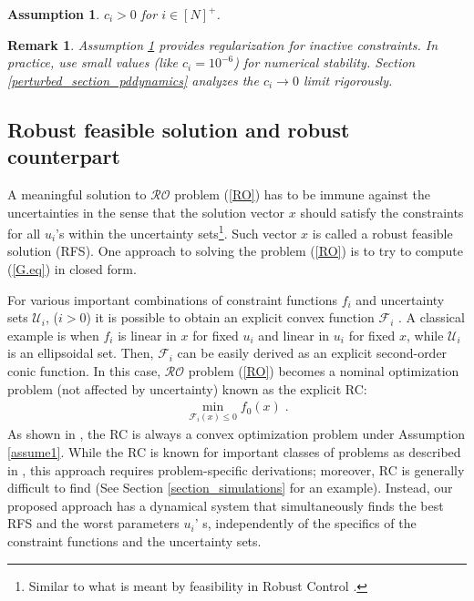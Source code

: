 \documentclass[journal,twoside,web]{ieeecolor}
\newcommand{\rev}[1]{#1}
\newtheorem{assumption}[theorem]{Assumption}
\newtheorem{remark}{Remark}
\begin{document}
\begin{assumption} \label{assume_c>0}
$c_i > 0$ for $i\in[N]^+$.
\end{assumption}

\begin{remark}\label{active_inactive_constraint_rem} 
\rev{Assumption \ref{assume_c>0} provides regularization for inactive constraints. In practice, use small values (like $c_i = 10^{-6}$) for numerical stability. Section \ref{perturbed_section_pddynamics} analyzes the $c_i \to 0$ limit rigorously.}
\end{remark}

\subsection{Robust feasible solution and robust counterpart}
A meaningful solution to $\mathcal{RO}$ problem (\ref{RO}) has to be immune against the uncertainties in the sense that the solution vector $x$ should satisfy the constraints for all $u_i$'s within the uncertainty sets\footnote{Similar to what is meant by feasibility in Robust Control \cite{zhou1995}.}. Such vector $x$ is called a robust feasible solution (RFS). One approach to solving the problem (\ref{RO}) is to try to compute (\ref{G.eq}) in closed form.

For various important combinations of constraint functions $f_i$ and uncertainty sets $\mathcal{U}_i$, ($i>0$) it is possible to obtain an explicit convex function $\mathcal{F}_i$ \cite{bental2009}. A classical example is when $f_i$ is linear in $x$ for fixed $u_i$ and linear in $u_i$ for fixed $x$, while $\mathcal{U}_i$ is an ellipsoidal set.
Then, $\mathcal{F}_i$ can be easily derived as an explicit second-order conic function.
In this case, $\mathcal{RO}$ problem (\ref{RO}) becomes a nominal optimization problem (not affected by uncertainty) known as the explicit RC:
\begin{align} \label{rc}
\displaystyle \min_{\mathcal{F}_i(x)\leq 0} f_0(x)\;.
\end{align}
As shown in \cite{bental2009-2}, the RC is always a convex optimization problem under Assumption \ref{assume1}. While the RC is known for important classes of problems as described in \cite{bertsimas2011}, this approach requires problem-specific derivations; moreover, RC is generally difficult to find (See Section \ref{section_simulations} for an example). Instead, our proposed approach has a dynamical system that simultaneously finds the best RFS and the worst parameters $u_i$' s, independently of the specifics of the constraint functions and the uncertainty sets.
\end{document}
